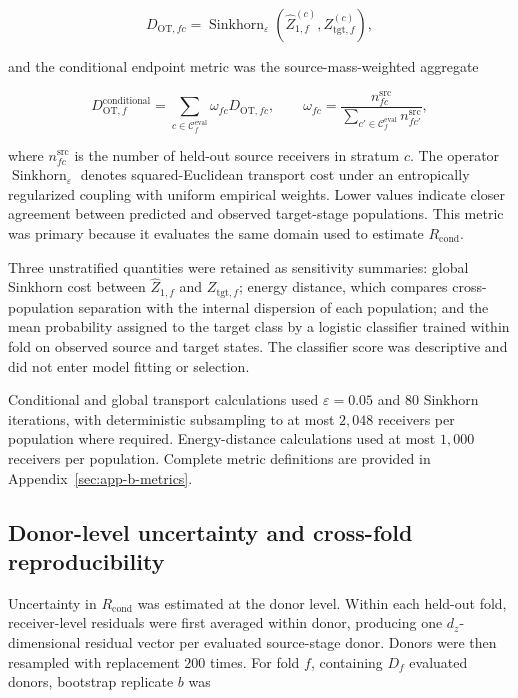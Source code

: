 \begin{equation}
D_{\mathrm{OT},fc}
=
\operatorname{Sinkhorn}_{\varepsilon}
\left(
\widehat{Z}_{1,f}^{(c)},
Z_{\mathrm{tgt},f}^{(c)}
\right),
\label{eq:methods-stratum-endpoint-cost}
\end{equation}

and the conditional endpoint metric was the source-mass-weighted aggregate

\begin{equation}
D_{\mathrm{OT},f}^{\mathrm{conditional}}
=
\sum_{c\in\mathcal{C}_f^{\mathrm{eval}}}
\omega_{fc}
D_{\mathrm{OT},fc},
\qquad
\omega_{fc}
=
\frac{
n_{fc}^{\mathrm{src}}
}{
\sum_{c'\in\mathcal{C}_f^{\mathrm{eval}}}
n_{fc'}^{\mathrm{src}}
},
\label{eq:methods-conditional-endpoint-cost}
\end{equation}

where \(n_{fc}^{\mathrm{src}}\) is the number of held-out source receivers in
stratum \(c\). The operator
\(\operatorname{Sinkhorn}_{\varepsilon}\) denotes squared-Euclidean transport
cost under an entropically regularized coupling with uniform empirical weights.
Lower values indicate closer agreement between predicted and observed
target-stage populations. This metric was primary because it evaluates the same domain used to
estimate \(R_{\mathrm{cond}}\).

Three unstratified quantities were retained as sensitivity summaries: global
Sinkhorn cost between \(\widehat{Z}_{1,f}\) and
\(Z_{\mathrm{tgt},f}\); energy distance, which compares cross-population
separation with the internal dispersion of each population; and the mean
probability assigned to the target class by a logistic classifier trained
within fold on observed source and target states. The classifier score was
descriptive and did not enter model fitting or selection.

Conditional and global transport calculations used
\(\varepsilon=0.05\) and \(80\) Sinkhorn iterations, with deterministic
subsampling to at most \(2{,}048\) receivers per population where required.
Energy-distance calculations used at most \(1{,}000\) receivers per
population. Complete metric definitions are provided in
Appendix~\ref{sec:app-b-metrics}.

\subsection{Donor-level uncertainty and cross-fold reproducibility}
\label{sec:methods-program-stability}

Uncertainty in \(R_{\mathrm{cond}}\) was estimated at the donor level. Within
each held-out fold, receiver-level residuals were first averaged within donor,
producing one \(d_z\)-dimensional residual vector per evaluated source-stage
donor. Donors were then resampled with replacement \(200\) times. For fold
\(f\), containing \(D_f\) evaluated donors, bootstrap replicate \(b\) was


